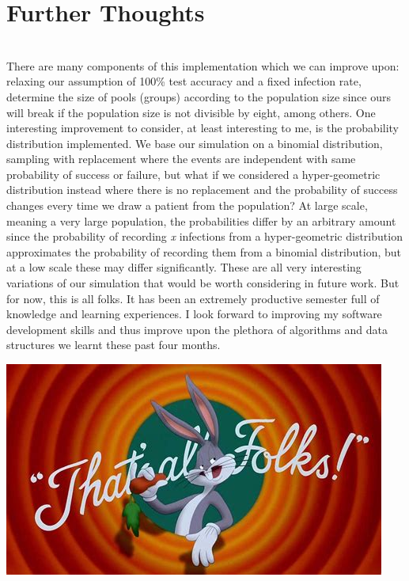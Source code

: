 \documentclass[letterpaper, 10pt]{article}
\begin{document}
\section{Further Thoughts}
\\
There are many components of this implementation which we can improve upon: relaxing our assumption of 100\% test accuracy and a fixed infection rate, determine the size of pools (groups) according to the population size since ours will break if the population size is not divisible by eight, among others. One interesting improvement to consider, at least interesting to me, is the probability distribution implemented. We base our simulation on a binomial distribution, sampling with replacement where the events are independent with same probability of success or failure, but what if we considered a hyper-geometric distribution instead where there is no replacement and the probability of success changes every time we draw a patient from the population? At large scale, meaning a very large population, the probabilities differ by an arbitrary amount since the probability of recording \textit{x} infections from a hyper-geometric distribution approximates the probability of recording them from a binomial distribution, but at a low scale these may differ significantly. These are all very interesting variations of our simulation that would be worth considering in future work. But for now, this is all folks. It has been an extremely productive semester full of knowledge and learning experiences. I look forward to improving my software development skills and thus improve upon the plethora of algorithms and data structures we learnt these past four months. 
\\
\begin{center}
    \includegraphics[scale=0.7]{images/folks.jpg}
\end{center}
\\
\end{document}
